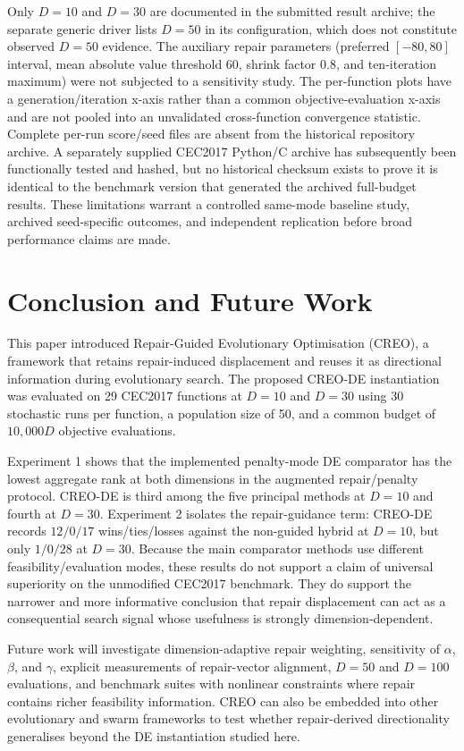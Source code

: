 \documentclass[a4paper,fleqn]{cas-sc}
\begin{document}
Only $D=10$ and $D=30$ are documented in the submitted result archive; the separate generic driver lists $D=50$ in its configuration, which does not constitute observed $D=50$ evidence. The auxiliary repair parameters (preferred $[-80,80]$ interval, mean absolute value threshold 60, shrink factor $0.8$, and ten-iteration maximum) were not subjected to a sensitivity study. The per-function plots have a generation/iteration x-axis rather than a common objective-evaluation x-axis and are not pooled into an unvalidated cross-function convergence statistic. Complete per-run score/seed files are absent from the historical repository archive. A separately supplied CEC2017 Python/C archive has subsequently been functionally tested and hashed, but no historical checksum exists to prove it is identical to the benchmark version that generated the archived full-budget results. These limitations warrant a controlled same-mode baseline study, archived seed-specific outcomes, and independent replication before broad performance claims are made.

\section{Conclusion and Future Work}

This paper introduced Repair-Guided Evolutionary Optimisation (CREO), a framework that retains repair-induced displacement and reuses it as directional information during evolutionary search. The proposed CREO-DE instantiation was evaluated on 29 CEC2017 functions at $D=10$ and $D=30$ using 30 stochastic runs per function, a population size of 50, and a common budget of $10{,}000D$ objective evaluations.

Experiment 1 shows that the implemented penalty-mode DE comparator has the lowest aggregate rank at both dimensions in the augmented repair/penalty protocol. CREO-DE is third among the five principal methods at $D=10$ and fourth at $D=30$. Experiment 2 isolates the repair-guidance term: CREO-DE records $12/0/17$ wins/ties/losses against the non-guided hybrid at $D=10$, but only $1/0/28$ at $D=30$. Because the main comparator methods use different feasibility/evaluation modes, these results do not support a claim of universal superiority on the unmodified CEC2017 benchmark. They do support the narrower and more informative conclusion that repair displacement can act as a consequential search signal whose usefulness is strongly dimension-dependent.

Future work will investigate dimension-adaptive repair weighting, sensitivity of $\alpha$, $\beta$, and $\gamma$, explicit measurements of repair-vector alignment, $D=50$ and $D=100$ evaluations, and benchmark suites with nonlinear constraints where repair contains richer feasibility information. CREO can also be embedded into other evolutionary and swarm frameworks to test whether repair-derived directionality generalises beyond the DE instantiation studied here.
\end{document}
